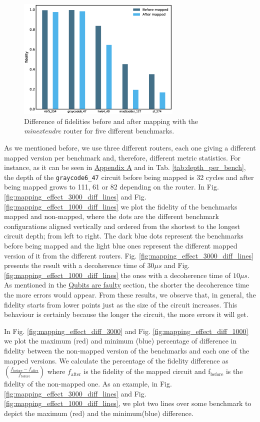 \begin{figure}[htbp]
\centering
\includegraphics[width=0.7\textwidth]{figures/f_diff_bar_plot.eps}
\caption{\label{fig:f_diff_bar_plot}
Difference of fidelities before and after mapping with the \emph{minextendrc} router for five different benchmarks.}
\end{figure}
As we mentioned before, we use three different routers, each one giving a different mapped version per benchmark and, therefore, different metric statistics.
For instance, as it can be seen in \href{appendix-1.org}{Appendix A} and in Tab. \ref{tab:depth_per_bench}, the depth of the \texttt{graycode6\_47} circuit before being mapped is 32 cycles and after being mapped grows to 111, 61 or 82 depending on the router.
In Fig. \ref{fig:mapping_effect_3000_diff_lines} and Fig. \ref{fig:mapping_effect_1000_diff_lines} we plot the fidelity of the benchmarks mapped and non-mapped, where the dots are the different benchmark configurations aligned vertically and ordered from the shortest to the longest circuit depth; from left to right.
The dark blue dots represent the benchmarks before being mapped and the light blue ones represent the different mapped version of it from the different routers.
Fig. \ref{fig:mapping_effect_3000_diff_lines} presents the result with a decoherence time of \(30 \mu s\) and Fig. \ref{fig:mapping_effect_1000_diff_lines} the ones with a decoherence time of \(10 \mu s\).
As mentioned in the \href{quantum_computing.org}{Qubits are faulty} section, the shorter the decoherence time the more errors would appear.
From these results, we observe that, in general, the fidelity starts from lower points just as the size of the circuit increases.
This behaviour is certainly because the longer the circuit, the more errors it will get.

In Fig. \ref{fig:mapping_effect_diff_3000} and Fig. \ref{fig:mapping_effect_diff_1000} we plot the maximum (red) and minimum (blue) percentage of difference in fidelity between the non-mapped version of the benchmarks and each one of the mapped versions.
We calculate the percentage of the fidelity difference as \(\left(\frac{f_{\text{before}} - f_{\text{after}}}{f_{\text{before}}}\right)\) where \(f_{\text{after}}\) is the fidelity of the mapped circuit and f\(_{\text{before}}\) is the fidelity of the non-mapped one.
As an example, in Fig. \ref{fig:mapping_effect_3000_diff_lines} and Fig. \ref{fig:mapping_effect_1000_diff_lines}, we plot two lines over some benchmark to depict the maximum (red) and the minimum(blue) difference.


